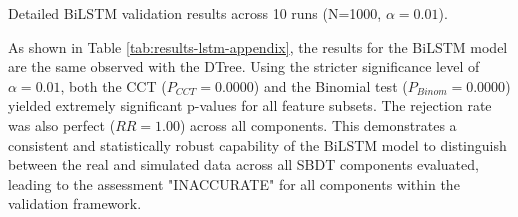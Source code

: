 \begin{appendices}
  \begin{table}[htbp]
    \centering
    \caption[Detailed BiLSTM Model Results]{Detailed BiLSTM validation results across 10 runs (N=1000, $\alpha=0.01$).}
    \label{tab:results-lstm-appendix}
    \caption*{Source: Author's tabulation based on permutation test results.}
  \end{table}

  As shown in Table \ref{tab:results-lstm-appendix}, the results for the BiLSTM model are the same observed with the DTree. Using the stricter significance level of $\alpha=0.01$, both the CCT ($P_{CCT}=0.0000$) and the Binomial test ($P_{Binom}=0.0000$) yielded extremely significant p-values for all feature subsets. The rejection rate was also perfect ($RR=1.00$) across all components. This demonstrates a consistent and statistically robust capability of the BiLSTM model to distinguish between the real and simulated data across all SBDT components evaluated, leading to the assessment "INACCURATE" for all components within the validation framework.



\end{appendices}
